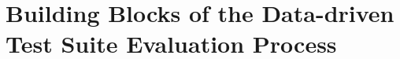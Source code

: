 
\section{Building Blocks of the Data-driven Test Suite Evaluation Process}
\label{sec:limitationsData}









\clearpage